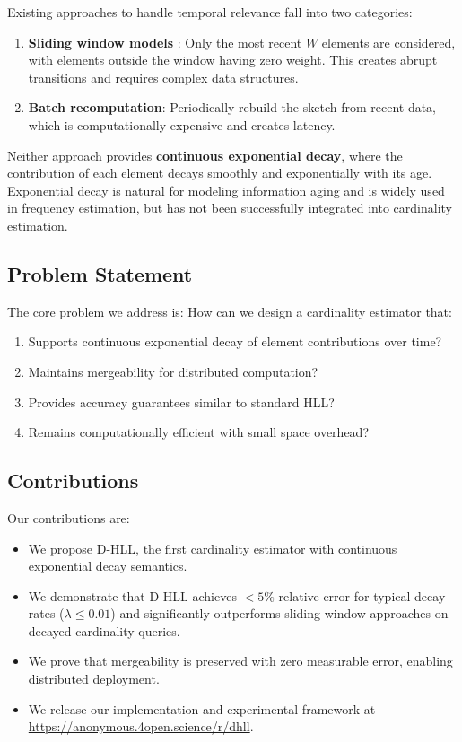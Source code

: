 \documentclass{article}
\begin{document}
Existing approaches to handle temporal relevance fall into two categories:
\begin{enumerate}
    \item \textbf{Sliding window models} \citep{chabchoub2010sliding}: Only the most recent $W$ elements are considered, with elements outside the window having zero weight. This creates abrupt transitions and requires complex data structures.
    \item \textbf{Batch recomputation}: Periodically rebuild the sketch from recent data, which is computationally expensive and creates latency.
\end{enumerate}

Neither approach provides \textbf{continuous exponential decay}, where the contribution of each element decays smoothly and exponentially with its age. Exponential decay is natural for modeling information aging \citep{cormode2009forward} and is widely used in frequency estimation, but has not been successfully integrated into cardinality estimation.

\subsection{Problem Statement}

The core problem we address is: How can we design a cardinality estimator that:
\begin{enumerate}
    \item Supports continuous exponential decay of element contributions over time?
    \item Maintains mergeability for distributed computation?
    \item Provides accuracy guarantees similar to standard HLL?
    \item Remains computationally efficient with small space overhead?
\end{enumerate}

\subsection{Contributions}

Our contributions are:
\begin{itemize}
    \item We propose D-HLL, the first cardinality estimator with continuous exponential decay semantics.
    \item We demonstrate that D-HLL achieves $<5\%$ relative error for typical decay rates ($\lambda \leq 0.01$) and significantly outperforms sliding window approaches on decayed cardinality queries.
    \item We prove that mergeability is preserved with zero measurable error, enabling distributed deployment.
    \item We release our implementation and experimental framework at \url{https://anonymous.4open.science/r/dhll}.
\end{itemize}
\end{document}
